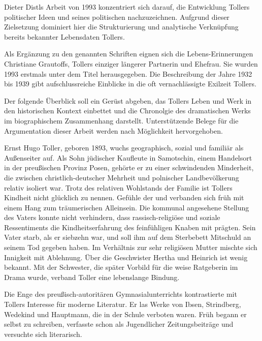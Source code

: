Dieter Distls Arbeit \Cite{Ernst Toller - Eine politische Bibliographie} von
1993 konzentriert sich darauf, die Entwicklung Tollers politischer Ideen und
seines politischen \Cite{Engagements} nachzuzeichnen. Aufgrund dieser
Zielsetzung dominiert hier die Strukturierung und analytische Verknüpfung
bereits bekannter Lebensdaten Tollers.  

Als Ergänzung zu den genannten Schriften eignen sich die Lebens-Erinnerungen
Christiane Grautoffs, Tollers einziger längerer Partnerin und Ehefrau. Sie
wurden 1993 erstmals unter dem Titel \Cite{Die Göttin und ihr Sozialist}
herausgegeben. Die Beschreibung der Jahre 1932 bis 1939 gibt aufschlussreiche
Einblicke in die oft vernachlässigte Exilzeit Tollers.


Der folgende Überblick soll ein Gerüst abgeben, das Tollers Leben und Werk in
den historischen Kontext einbettet und die Chronolgie des dramatischen Werks
im biographischem Zusammenhang darstellt.  Unterstützende Belege für die
Argumentation dieser Arbeit werden nach Möglichkeit hervorgehoben.


Ernst Hugo Toller, geboren 1893, wuchs geographisch, sozial und familiär als
Außenseiter auf. Als Sohn jüdischer Kaufleute in Samotschin, einem Handelsort
in der preußischen Provinz Posen, gehörte er zu einer schwindenden Minderheit,
die zwischen christlich-deutscher Mehrheit und polnischer Landbevölkerung
relativ isoliert war. Trotz des relativen Wohlstands der Familie ist Tollers
Kindheit nicht glücklich zu nennen. 
Gefühle der \Cite{Fremdheit} und \Cite{Unzugehörigkeit} verbanden sich früh
mit einem Hang zum
träumerischen Alleinsein. Die kommunal angesehene Stellung des Vaters konnte
nicht verhindern, dass rassisch-religiöse und soziale Ressentiments die
Kindheitserfahrung des feinfühligen Knaben mit prägten. Sein Vater starb, als
er siebzehn war, und soll ihm auf dem Sterbebett Mitschuld an seinem Tod
gegeben haben. Im Verhältnis zur sehr religiösen Mutter mischte sich Innigkeit
mit Ablehnung. Über die Geschwister Hertha und Heinrich ist wenig bekannt. Mit
der Schwester, die später Vorbild für die weise Ratgeberin im Drama \Cite{Die
Wandlung} wurde, verband Toller eine
lebenslange Bindung.

Die Enge des preußisch-autoritären Gymnasialunterrichts kontrastierte mit
Tollers Interesse für moderne Literatur. Er las Werke von Ibsen, Strindberg,
Wedekind und Hauptmann, die in der Schule verboten waren. Früh begann er
selbst zu schreiben, verfasste schon als Jugendlicher Zeitungsbeiträge und
versuchte sich literarisch.

